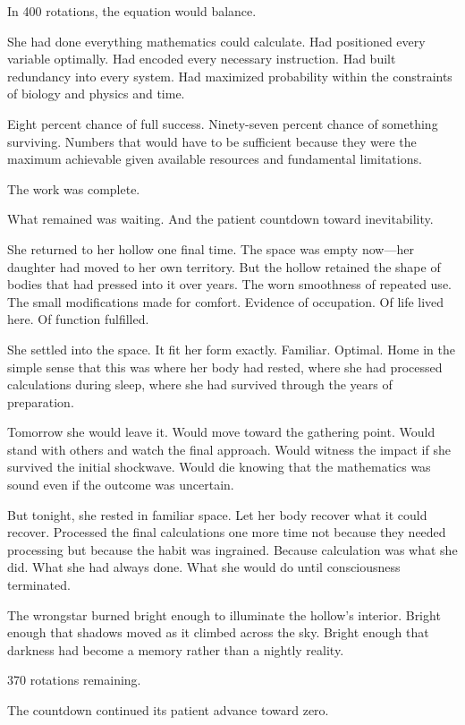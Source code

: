 In 400 rotations, the equation would balance.

She had done everything mathematics could calculate. Had positioned every variable optimally. Had encoded every necessary instruction. Had built redundancy into every system. Had maximized probability within the constraints of biology and physics and time.

Eight percent chance of full success. Ninety-seven percent chance of something surviving. Numbers that would have to be sufficient because they were the maximum achievable given available resources and fundamental limitations.

The work was complete.

What remained was waiting. And the patient countdown toward inevitability.

\scenebreak

She returned to her hollow one final time. The space was empty now—her daughter had moved to her own territory. But the hollow retained the shape of bodies that had pressed into it over years. The worn smoothness of repeated use. The small modifications made for comfort. Evidence of occupation. Of life lived here. Of function fulfilled.

She settled into the space. It fit her form exactly. Familiar. Optimal. Home in the simple sense that this was where her body had rested, where she had processed calculations during sleep, where she had survived through the years of preparation.

Tomorrow she would leave it. Would move toward the gathering point. Would stand with others and watch the final approach. Would witness the impact if she survived the initial shockwave. Would die knowing that the mathematics was sound even if the outcome was uncertain.

But tonight, she rested in familiar space. Let her body recover what it could recover. Processed the final calculations one more time not because they needed processing but because the habit was ingrained. Because calculation was what she did. What she had always done. What she would do until consciousness terminated.

The wrongstar burned bright enough to illuminate the hollow's interior. Bright enough that shadows moved as it climbed across the sky. Bright enough that darkness had become a memory rather than a nightly reality.

370 rotations remaining.

The countdown continued its patient advance toward zero.


